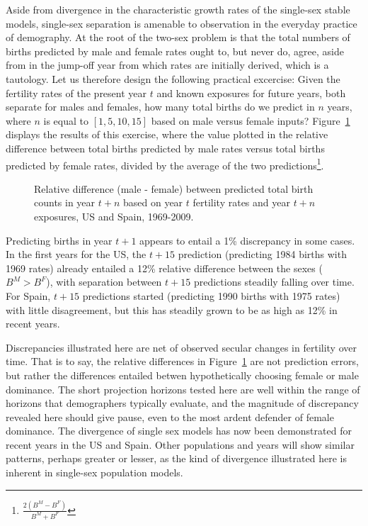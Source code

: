  \FloatBarrier
\label{sec:divbirth}
Aside from divergence in the characteristic growth rates of the single-sex
stable models, single-sex separation is amenable to observation in the everyday
practice of demography. At the root of the two-sex problem is that the total
numbers of births predicted by male and female rates ought to, but never do,
agree, aside from in the jump-off year from which rates are initially derived, 
which is a tautology. Let us therefore design the following practical excercise:
Given the fertility rates of the present year $t$ and known exposures for
future years, both separate for males and females, how many total births do we
predict in $n$ years, where $n$ is equal to $[1, 5, 10, 15]$ based on male
versus female inputs? Figure~\ref{fig:BirthCountDivergenceAge} displays the
results of this exercise, where the value plotted in the relative
difference between total births predicted by male
rates versus total births predicted by female rates, divided by
the average of the two predictions\footnote{$\frac{2(B^M - B^F)}{B^M + B^F}$}.

\begin{figure}[ht!]
        \centering  
          \caption{Relative difference (male - female) between predicted total
          birth counts in year $t+n$ based on year $t$ fertility rates and year $t+n$ exposures, US and Spain, 1969-2009.}
          \label{fig:BirthCountDivergenceAge}
\end{figure}

Predicting births in year $t+1$ appears to entail a 1\% discrepancy in some
cases. In the first years for the US, the $t+15$ prediction (predicting
1984 births with 1969 rates) already entailed a 12\% relative difference
between the sexes ($B^M > B^F$), with separation between $t+15$ predictions
steadily falling over time. For Spain, $t+15$ predictions started (predicting 1990
births with 1975 rates) with little disagreement, but this has steadily grown to be as high
as 12\% in recent years.

Discrepancies illustrated here are net of observed secular changes in
fertility over time. That is to say, the relative differences in
Figure~\ref{fig:BirthCountDivergenceAge} are not prediction errors, but rather
the differences entailed betwen hypothetically choosing female or male
dominance. The short projection horizons tested here are well within the range
of horizons that demographers typically evaluate, and the magnitude of
discrepancy revealed here should give pause, even to the most ardent defender
of female dominance. The divergence of single sex
models has now been demonstrated for recent years in the US and Spain. Other
populations and years will show similar patterns, perhaps greater or lesser, as
the kind of divergence illustrated here is inherent in single-sex
population models.


